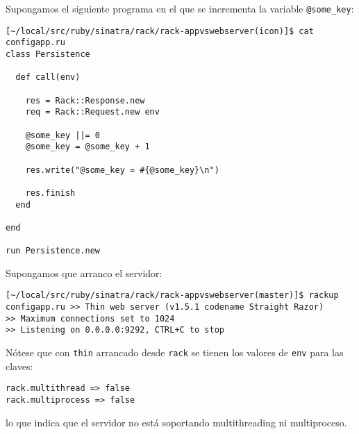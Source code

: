 Supongamos el siguiente programa \rack{} en el que se incrementa 
la variable \verb|@some_key|:
\begin{verbatim}
[~/local/src/ruby/sinatra/rack/rack-appvswebserver(icon)]$ cat configapp.ru 
class Persistence

  def call(env)
    
    res = Rack::Response.new
    req = Rack::Request.new env

    @some_key ||= 0
    @some_key = @some_key + 1 

    res.write("@some_key = #{@some_key}\n")

    res.finish
  end

end

run Persistence.new
\end{verbatim}

Supongamos que arranco el servidor:
\begin{verbatim}
[~/local/src/ruby/sinatra/rack/rack-appvswebserver(master)]$ rackup configapp.ru >> Thin web server (v1.5.1 codename Straight Razor)
>> Maximum connections set to 1024
>> Listening on 0.0.0.0:9292, CTRL+C to stop
\end{verbatim}

Nótese que con \verb|thin| arrancado desde \verb|rack|
se tienen los valores de \verb|env| para las claves:
\begin{verbatim}
rack.multithread => false
rack.multiprocess => false
\end{verbatim}
lo que indica que el servidor no está soportando multithreading ni multiproceso.

